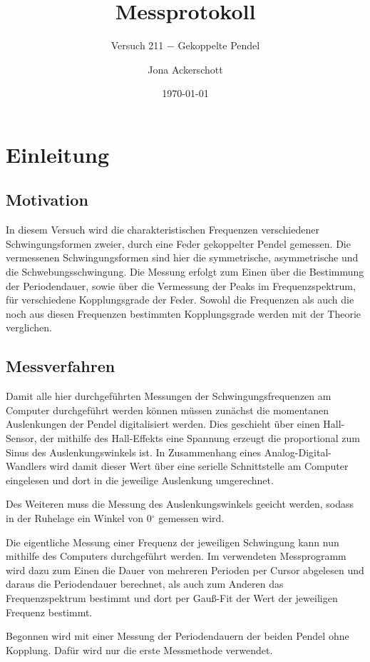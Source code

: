 \documentclass[12pt,a4paper,german]{scrartcl}
\author{Jona Ackerschott}
\title{Messprotokoll}
\subtitle{Versuch 211 $-$ Gekoppelte Pendel}
\date{\today}
\numberwithin{equation}{section}
\begin{document}
  \maketitle

  \tableofcontents

  \section{Einleitung}
  \subsection{Motivation}
  In diesem Versuch wird die charakteristischen Frequenzen verschiedener Schwingungsformen zweier, durch eine Feder gekoppelter Pendel gemessen.
  Die vermessenen Schwingungsformen sind hier die symmetrische, asymmetrische und die Schwebungsschwingung.
  Die Messung erfolgt zum Einen über die Bestimmung der Periodendauer, sowie über die Vermessung der Peaks im Frequenzspektrum, für verschiedene Kopplungsgrade der Feder.
  Sowohl die Frequenzen als auch die noch aus diesen Frequenzen bestimmten Kopplungsgrade werden mit der Theorie verglichen.

  \subsection{Messverfahren}
  Damit alle hier durchgeführten Messungen der Schwingungsfrequenzen am Computer durchgeführt werden können müssen zunächst die momentanen Auslenkungen der Pendel digitalisiert werden.
  Dies geschieht über einen Hall-Sensor, der mithilfe des Hall-Effekts eine Spannung erzeugt die proportional zum Sinus des Auslenkungswinkels ist.
  In Zusammenhang eines Analog-Digital-Wandlers wird damit dieser Wert über eine serielle Schnittstelle am Computer eingelesen und dort in die jeweilige Auslenkung umgerechnet.

  Des Weiteren muss die Messung des Auslenkungswinkels geeicht werden, sodass in der Ruhelage ein Winkel von 0$^\circ$ gemessen wird.

  Die eigentliche Messung einer Frequenz der jeweiligen Schwingung kann nun mithilfe des Computers durchgeführt werden.
  Im verwendeten Messprogramm wird dazu zum Einen die Dauer von mehreren Perioden per Cursor abgelesen und daraus die Periodendauer berechnet, als auch zum Anderen das Frequenzspektrum bestimmt und dort per Gauß-Fit der Wert der jeweiligen Frequenz bestimmt.

  Begonnen wird mit einer Messung der Periodendauern der beiden Pendel ohne Kopplung.
  Dafür wird nur die erste Messmethode verwendet.
\end{document}
